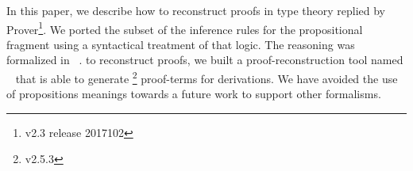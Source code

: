 \documentclass[../main.tex]{subfiles}
\begin{document}
In this paper, we describe how to reconstruct proofs in type theory
replied by \Metis Prover\footnote{v2.3 release 2017102}.
We ported the subset of the \Metis inference rules for the propositional 
fragment using a syntactical treatment of that logic. The \Metis reasoning was formalized in \Agda~\cite{AgdaProp,AgdaMetis}. 
to reconstruct \Metis proofs, we built a proof-reconstruction tool named
\Athena~\cite{Athena} that is able to generate \Agda\footnote{v2.5.3} proof-terms for \Metis derivations. We have avoided the use of propositions meanings towards a future work to support other formalisms.













%






\end{document}
